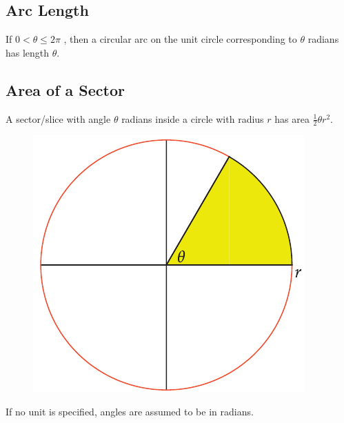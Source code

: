 \subsection{Arc Length}
If $0 < \theta \leq 2\pi$ , then a circular arc on the unit circle corresponding to $\theta$ radians has length $\theta$.

\subsection{Area of a Sector}
A sector/slice with angle $\theta$ radians inside a circle with radius $r$ has area $\frac{1}{2} \theta r^{2}$.
\begin{figure}[h]
    \centering
    \includegraphics[scale=0.25]{pics/6.png}
\end{figure}
If no unit is specified, angles are assumed to be in radians.

